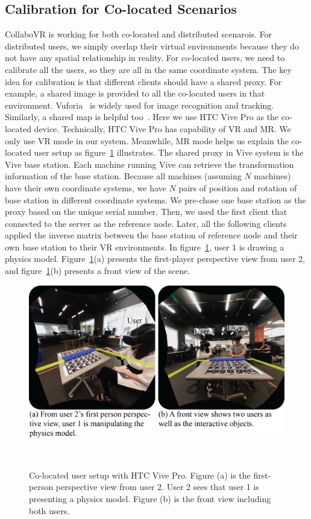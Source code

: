 \documentclass{sigchi}
\begin{document}
\subsection{Calibration for Co-located Scenarios}
CollaboVR is working for both co-located and distributed scenarois. For distributed users, we simply overlap their virtual environments because they do not have any spatial relationship in reality. For co-located users, we need to calibrate all the users, so they are all in the same coordinate system. The key idea for calibration is that different clients should have a shared proxy. For example, a shared image is provided to all the co-located users in that environment. Vuforia~\cite{Vuforia} is widely used for image recognition and tracking. Similarly, a shared map is helpful too~\cite{Hololens}. Here we use HTC Vive Pro as the co-located device. Technically, HTC Vive Pro has capability of VR and MR. We only use VR mode in our system. Meanwhile, MR mode helps us explain the co-located user setup as figure~\ref{fig:vivepro} illustrates. The shared proxy in Vive system is the Vive base station. Each machine running Vive can retrieve the transformation information of the base station. Because all machines (assuming $N$ machines) have their own coordinate systems, we have $N$ pairs of position and rotation of base station in different coordinate systems. We pre-chose one base station as the proxy based on the unique serial number. Then, we used the first client that connected to the server as the reference node. Later, all the following clients applied the inverse matrix between the base station of reference node and their own base station to their VR environments. In figure~\ref{fig:vivepro}, user 1 is drawing a physics model. Figure~\ref{fig:vivepro}(a) presents the first-player perspective view from user 2, and figure~\ref{fig:vivepro}(b) presents a front view of the scene.

\begin{figure}[tb!]
 \centering
 \includegraphics[width=0.95\columnwidth]{Figure5.png}
 \caption{Co-located user setup with HTC Vive Pro. Figure (a) is the first-person perspective view from user 2. User 2 sees that user 1 is presenting a physics model. Figure (b) is the front view including both users.
 }~\label{fig:vivepro}
\end{figure}
\end{document}
